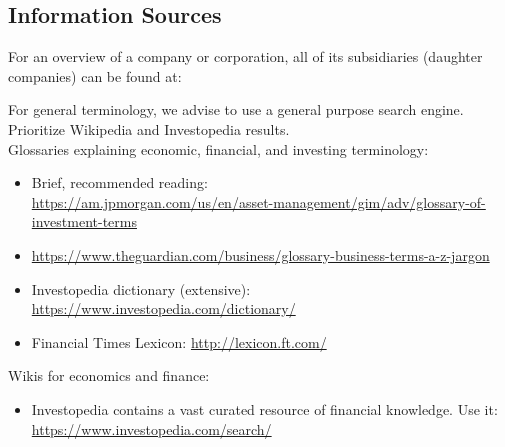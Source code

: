 {\subsection{Information Sources}
\label{subsec:resources}
For an overview of a company or corporation, all of its subsidiaries (daughter companies) can be found at:

For general terminology, we advise to use a general purpose search engine.
Prioritize Wikipedia and Investopedia results.\\

\noindent
Glossaries explaining economic, financial, and investing terminology:
\begin{itemize}[noitemsep, leftmargin=*]
    \item Brief, recommended reading:\\ \url{https://am.jpmorgan.com/us/en/asset-management/gim/adv/glossary-of-investment-terms}
    \item \url{https://www.theguardian.com/business/glossary-business-terms-a-z-jargon}
    \item Investopedia dictionary (extensive): \url{https://www.investopedia.com/dictionary/}
    \item Financial Times Lexicon: \url{http://lexicon.ft.com/}
\end{itemize}

\noindent
Wikis for economics and finance:
\begin{itemize}[noitemsep, leftmargin=*]
    \item Investopedia contains a vast curated resource of financial knowledge. Use it:\\
    \url{https://www.investopedia.com/search/}
\end{itemize}

}